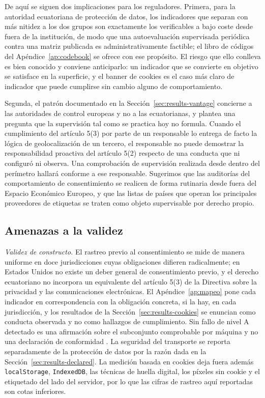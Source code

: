 \documentclass[pdflatex,sn-basic,Numbered,iicol]{sn-jnl}
\theoremstyle{thmstyleone}
\theoremstyle{thmstyletwo}
\theoremstyle{thmstylethree}
\begin{document}
De aqu\'i se siguen dos implicaciones para los reguladores. Primera, para la autoridad ecuatoriana de protecci\'on de datos, los indicadores que separan con m\'as nitidez a los dos grupos son exactamente los verificables a bajo coste desde fuera de la instituci\'on, de modo que una autoevaluaci\'on supervisada peri\'odica contra una matriz publicada es administrativamente factible; el libro de c\'odigos del Ap\'endice~\ref{ap:codebook} se ofrece con ese prop\'osito. El riesgo que ello conlleva es bien conocido y conviene anticiparlo: un indicador que se convierte en objetivo se satisface en la superficie, y el banner de cookies es el caso m\'as claro de indicador que puede cumplirse sin cambio alguno de comportamiento.

Segunda, el patr\'on documentado en la Secci\'on~\ref{sec:results-vantage} concierne a las autoridades de control europeas y no a las ecuatorianas, y plantea una pregunta que la supervisi\'on tal como se practica hoy no formula. Cuando el cumplimiento del art\'iculo 5(3) por parte de un responsable lo entrega de facto la l\'ogica de geolocalizaci\'on de un tercero, el responsable no puede demostrar la responsabilidad proactiva del art\'iculo 5(2) respecto de una conducta que ni configur\'o ni observa. Una comprobaci\'on de supervisi\'on realizada desde dentro del per\'imetro hallar\'a conforme a ese responsable. Sugerimos que las auditor\'ias del comportamiento de consentimiento se realicen de forma rutinaria desde fuera del Espacio Econ\'omico Europeo, y que las listas de pa\'ises que operan los principales proveedores de etiquetas se traten como objeto supervisable por derecho propio.

\subsection{Amenazas a la validez}\label{sec:threats}

\emph{Validez de constructo.} El rastreo previo al consentimiento se mide de manera uniforme en doce jurisdicciones cuyas obligaciones difieren radicalmente; en Estados Unidos no existe un deber general de consentimiento previo, y el derecho ecuatoriano no incorpora un equivalente del art\'iculo 5(3) de la Directiva sobre la privacidad y las comunicaciones electr\'onicas. El Ap\'endice~\ref{ap:mapeo} pone cada indicador en correspondencia con la obligaci\'on concreta, si la hay, en cada jurisdicci\'on, y los resultados de la Secci\'on~\ref{sec:results-cookies} se enuncian como conducta observada y no como hallazgos de cumplimiento. \guillemotleft Sin fallo de nivel A detectado\guillemotright{} es una afirmaci\'on sobre el subconjunto comprobable por m\'aquina y no una declaraci\'on de conformidad \citep{fischer2025coverage}. La seguridad del transporte se reporta separadamente de la protecci\'on de datos por la raz\'on dada en la Secci\'on~\ref{sec:results-declared}. La medici\'on basada en cookies deja fuera adem\'as \verb|localStorage|, \verb|IndexedDB|, las t\'ecnicas de huella digital, los p\'ixeles sin cookie y el etiquetado del lado del servidor, por lo que las cifras de rastreo aqu\'i reportadas son cotas inferiores.
\end{document}
